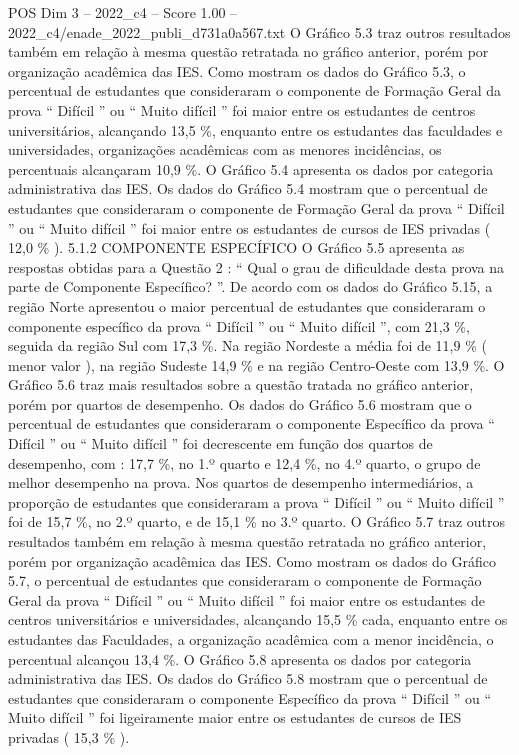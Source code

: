 \begin{textsample}{POS Dim 3 – 2022\_c4 – Score 1.00 – 2022\_c4/enade\_2022\_publi\_d731a0a567.txt}
O Gráfico 5.3 traz outros resultados também em relação à mesma questão retratada no gráfico anterior, porém por organização acadêmica das IES.
Como mostram os dados do Gráfico 5.3, o percentual de estudantes que consideraram o componente de Formação Geral da prova “ Difícil ” ou “ Muito difícil ” foi maior entre os estudantes de centros universitários, alcançando 13,5 \%, enquanto entre os estudantes das faculdades e universidades, organizações acadêmicas com as menores incidências, os percentuais alcançaram 10,9 \%.
O Gráfico 5.4 apresenta os dados por categoria administrativa das IES.
Os dados do Gráfico 5.4 mostram que o percentual de estudantes que consideraram o componente de Formação Geral da prova “ Difícil ” ou “ Muito difícil ” foi maior entre os estudantes de cursos de IES privadas ( 12,0 \% ). 5.1.2 COMPONENTE ESPECÍFICO O Gráfico 5.5 apresenta as respostas obtidas para a Questão 2 : “ Qual o grau de dificuldade desta prova na parte de Componente Específico? ”.
De acordo com os dados do Gráfico 5.15, a região Norte apresentou o maior percentual de estudantes que consideraram o componente específico da prova “ Difícil ” ou “ Muito difícil ”, com 21,3 \%, seguida da região Sul com 17,3 \%.
Na região Nordeste a média foi de 11,9 \% ( menor valor ), na região Sudeste 14,9 \% e na região Centro-Oeste com 13,9 \%.
O Gráfico 5.6 traz mais resultados sobre a questão tratada no gráfico anterior, porém por quartos de desempenho.
Os dados do Gráfico 5.6 mostram que o percentual de estudantes que consideraram o componente Específico da prova “ Difícil ” ou “ Muito difícil ” foi decrescente em função dos quartos de desempenho, com : 17,7 \%, no 1.º quarto e 12,4 \%, no 4.º quarto, o grupo de melhor desempenho na prova.
Nos quartos de desempenho intermediários, a proporção de estudantes que consideraram a prova “ Difícil ” ou “ Muito difícil ” foi de 15,7 \%, no 2.º quarto, e de 15,1 \% no 3.º quarto.
O Gráfico 5.7 traz outros resultados também em relação à mesma questão retratada no gráfico anterior, porém por organização acadêmica das IES.
Como mostram os dados do Gráfico 5.7, o percentual de estudantes que consideraram o componente de Formação Geral da prova “ Difícil ” ou “ Muito difícil ” foi maior entre os estudantes de centros universitários e universidades, alcançando 15,5 \% cada, enquanto entre os estudantes das Faculdades, a organização acadêmica com a menor incidência, o percentual alcançou 13,4 \%.
O Gráfico 5.8 apresenta os dados por categoria administrativa das IES.
Os dados do Gráfico 5.8 mostram que o percentual de estudantes que consideraram o componente Específico da prova “ Difícil ” ou “ Muito difícil ” foi ligeiramente maior entre os estudantes de cursos de IES privadas ( 15,3 \% ).

\end{textsample}
